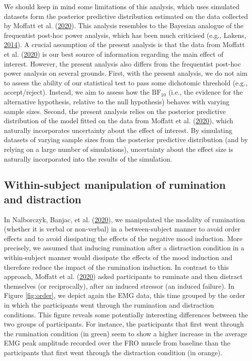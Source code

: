 \documentclass[
  english,
  man, donotrepeattitle,floatsintext]{apa6}
\begin{document}
We should keep in mind some limitations of this analysis, which uses simulated datasets form the posterior predictive distribution estimated on the data collected by Moffatt et al. (\protect\hyperlink{ref-moffatt_inner_2020}{2020}). This analysis resembles to the Bayesian analogue of the frequentist post-hoc power analysis, which has been much criticised (e.g., Lakens, \protect\hyperlink{ref-lakens_20_2014}{2014}). A crucial assumption of the present analysis is that the data from Moffatt et al. (\protect\hyperlink{ref-moffatt_inner_2020}{2020}) is our best source of information regarding the main effect of interest. However, the present analysis also differs from the frequentist post-hoc power analysis on several grounds. First, with the present analysis, we do not aim to assess the ability of our statistical test to pass some dichotomic threshold (e.g., accept/reject). Instead, we aim to assess how the \(\text{BF}_{10}\) (i.e., the evidence for the alternative hypothesis, relative to the null hypothesis) behaves with varying sample sizes. Second, the present analysis relies on the posterior predictive distribution of the model fitted on the data from Moffatt et al. (\protect\hyperlink{ref-moffatt_inner_2020}{2020}), which naturally incorporates uncertainty about the effect of interest. By simulating datasets of varying sample sizes from the posterior predictive distribution (and by relying on a large number of simulations), uncertainty about the effect size is naturally incorporated into the results of the simulation.

\hypertarget{within-subject-manipulation-of-rumination-and-distraction}{%
\subsection{Within-subject manipulation of rumination and distraction}\label{within-subject-manipulation-of-rumination-and-distraction}}

In Nalborczyk, Banjac, et al. (\protect\hyperlink{ref-nalborczyk_dissociating_2020}{2020}), we manipulated the modality of rumination (whether it is verbal or non-verbal) in a between-subject manner to avoid order effects and to avoid dissipating the effects of the negative mood induction. More precisely, we assumed that inducing rumination after a distraction condition in a within-subject manner would dissipate the effects of the mood induction and therefore reduce the impact of the rumination induction. In contrast to this approach, Moffatt et al. (\protect\hyperlink{ref-moffatt_inner_2020}{2020}) asked participants to ruminate and then distract themselves (or reciprocally), after an induced stressor (an induced failure). In Figure \ref{fig:order}, we depict again the EMG data, this time grouped by the order in which the participants went through the rumination and distraction conditions. This figure reveals some potentially interesting differences between the two groups of participants. For instance, the participants that first went through the rumination condition (in green) seem to show a higher increase in the average EMG peak amplitude recorded over the FRO muscle from baseline than the participants that first went through the distraction condition (in orange).
\end{document}
